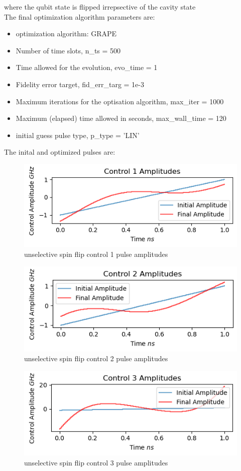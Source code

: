 \documentclass{article}
\begin{document}
where the qubit state is flipped irrepsective of the cavity state
\\
The final optimization algorithm parameters are:
\\ 
\begin{itemize}
    \item optimization algorithm: GRAPE
    \item Number of time slots, n\_ts = 500
    \item Time allowed for the evolution, evo\_time = 1
    \item Fidelity error target, fid\_err\_targ = 1e-3
    \item Maximum iterations for the optisation algorithm, max\_iter = 1000
    \item Maximum (elapsed) time allowed in seconds, max\_wall\_time = 120
    \item initial guess pulse type, p\_type = 'LIN'
\end{itemize}

The inital and optimized pulses are: 
\begin{figure}[H]
    \centering
    \includegraphics[width=0.6\linewidth]{unselective_spin_flip_control1.png}
    \caption{unselective spin flip control 1 pulse amplitudes}
    \label{fig:unselective_spin_flip_control1}
\end{figure}
\begin{figure}[H]
    \centering
    \includegraphics[width=0.6\linewidth]{unselective_spin_flip_control2.png}
    \caption{unselective spin flip control 2 pulse amplitudes}
    \label{fig:unselective_spin_flip_control2}
\end{figure}
\begin{figure}[H]
    \centering
    \includegraphics[width=0.6\linewidth]{unselective_spin_flip_control3.png}
    \caption{unselective spin flip control 3 pulse amplitudes}
    \label{fig:unselective_spin_flip_control3}
\end{figure}
\end{document}
